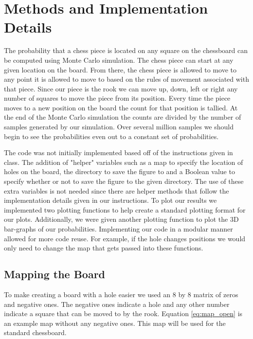 \documentclass{amsart}
\numberwithin{equation}{section}
\begin{document}
\section{Methods and Implementation Details}
The probability that a chess piece is located on any square on the chessboard can be computed using Monte Carlo simulation. The chess piece can start at any given location on the board. From there, the chess piece is allowed to move to any point it is allowed to move to based on the rules of movement associated with that piece. Since our piece is the rook we can move up, down, left or right any number of squares to move the piece from its position. Every time the piece moves to a new position on the board the count for that position is tallied. At the end of the Monte Carlo simulation the counts are divided by the number of samples generated by our simulation. Over several million samples we should begin to see the probabilities even out to a constant set of probabilities. \par
The code was not initially implemented based off of the instructions given in class. The addition of "helper" variables such as a map to specify the location of holes on the board, the directory to save the figure to and a Boolean value to specify whether or not to save the figure to the given directory. The use of these extra variables is not needed since there are helper methods that follow the implementation details given in our instructions. To plot our results we implemented two plotting functions to help create a standard plotting format for our plots. Additionally, we were given another plotting function to plot the 3D bar-graphs of our probabilities. Implementing our code in a modular manner allowed for more code reuse. For example, if the hole changes positions we would only need to change the map that gets passed into these functions. 

\subsection{Mapping the Board}
To make creating a board with a hole easier we used an 8 by 8 matrix of zeros and negative ones. The negative ones indicate a hole and any other number indicate a square that can be moved to by the rook. Equation \ref{eq:map_open} is an example map without any negative ones. This map will be used for the standard chessboard. 
\end{document}
